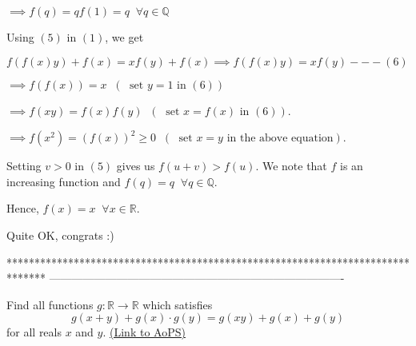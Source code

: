 \begin{solution}
$ \implies f(q) = qf(1) = q \;\;\forall q \in \mathbb{Q}$

Using $ (5)$ in $ (1)$, we get

$ f(f(x)y) + f(x) = xf(y) + f(x) \implies f(f(x)y) = xf(y) - - - (6)$ 

$ \implies f(f(x)) = x \;\;(\;\text{ set } y = 1 \text{ in } (6))$

$ \implies f(xy) = f(x)f(y) \;\;(\;\text{ set } x = f(x) \text { in } (6))$.

$ \implies f(x^2) = (f(x))^2 \geq 0 \;\;(\;\text{ set } x = y \text { in the above equation})$.

Setting $ v > 0$ in $ (5)$ gives us $ f(u + v) > f(u)$. We note that $ f$ is an increasing function and $ f(q) = q \;\;\forall q \in \mathbb{Q}$.

Hence, $ f(x) = x\;\;\forall x \in \mathbb{R}$.
\end{solution}



\begin{solution}
	Quite OK, congrats  :)
\end{solution}
*******************************************************************************
-------------------------------------------------------------------------------

\begin{problem}
	Find all functions $ g : \mathbb{R}\to \mathbb{R}$ which satisfies
\[g(x+y)+g(x) \cdot g(y)=g(xy)+g(x)+g(y)\]
for all reals $x$ and $y$.
	\flushright \href{https://artofproblemsolving.com/community/c6h295605}{(Link to AoPS)}
\end{problem}



